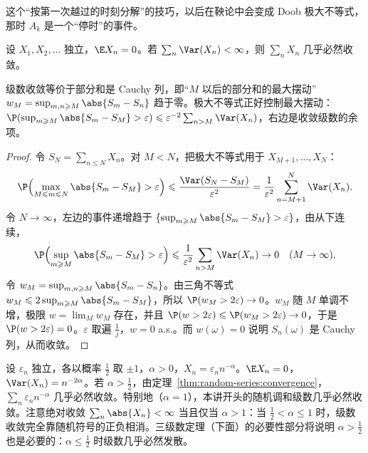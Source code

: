 这个“按第一次越过的时刻分解”的技巧，以后在鞅论中会变成 Doob 极大不等式，那时 $A_k$ 是一个“停时”的事件。


\begin{theorem}\label{thm:random-series:convergence}
设 $X_1,X_2,\dots$ 独立，$\E X_n=0$。若 $\sum_n\Var(X_n)<\infty$，则 $\sum_nX_n$ 几乎必然收敛。
\end{theorem}

\begin{remark}[证明思路]
级数收敛等价于部分和是 Cauchy 列，即“$M$ 以后的部分和的最大摆动”$w_M=\sup_{m,n\geqslant M}\abs{S_m-S_n}$ 趋于零。极大不等式正好控制最大摆动：$\P(\sup_{m\geqslant M}\abs{S_m-S_M}>\varepsilon)\leqslant\varepsilon^{-2}\sum_{n>M}\Var(X_n)$，右边是收敛级数的余项。
\end{remark}

\begin{proof}
令 $S_N=\sum_{n\leqslant N}X_n$。对 $M<N$，把极大不等式用于 $X_{M+1},\dots,X_N$：
\[
\P\Bigl(\max_{M\leqslant m\leqslant N}\abs{S_m-S_M}>\varepsilon\Bigr)\leqslant\frac{\Var(S_N-S_M)}{\varepsilon^2}=\frac1{\varepsilon^2}\sum_{n=M+1}^N\Var(X_n).
\]
令 $N\to\infty$，左边的事件递增趋于 $\{\sup_{m\geqslant M}\abs{S_m-S_M}>\varepsilon\}$，由从下连续，
\[
\P\Bigl(\sup_{m\geqslant M}\abs{S_m-S_M}>\varepsilon\Bigr)\leqslant\frac1{\varepsilon^2}\sum_{n>M}\Var(X_n)\to0\quad(M\to\infty).
\]
令 $w_M=\sup_{m,n\geqslant M}\abs{S_m-S_n}$。由三角不等式 $w_M\leqslant2\sup_{m\geqslant M}\abs{S_m-S_M}$，所以 $\P(w_M>2\varepsilon)\to0$。$w_M$ 随 $M$ 单调不增，极限 $w=\lim_Mw_M$ 存在，并且 $\P(w>2\varepsilon)\leqslant \P(w_M>2\varepsilon)\to0$，于是 $\P(w>2\varepsilon)=0$。$\varepsilon$ 取遍 $\frac1j$，$w=0$ a.s.。而 $w(\omega)=0$ 说明 $S_n(\omega)$ 是 Cauchy 列，从而收敛。
\end{proof}

\begin{example}[随机符号的级数]\label{ex:random-series:random-signs}
设 $\varepsilon_n$ 独立，各以概率 $\frac12$ 取 $\pm1$，$\alpha>0$，$X_n=\varepsilon_nn^{-\alpha}$。$\E X_n=0$，$\Var(X_n)=n^{-2\alpha}$。若 $\alpha>\frac12$，由定理~\ref{thm:random-series:convergence}，$\sum_n\varepsilon_nn^{-\alpha}$ 几乎必然收敛。特别地（$\alpha=1$），本讲开头的随机调和级数几乎必然收敛。注意绝对收敛 $\sum_n\abs{X_n}<\infty$ 当且仅当 $\alpha>1$：当 $\frac12<\alpha\leqslant1$ 时，级数收敛完全靠随机符号的正负相消。三级数定理（下面）的必要性部分将说明 $\alpha>\frac12$ 也是必要的：$\alpha\leqslant\frac12$ 时级数几乎必然发散。
\end{example}

